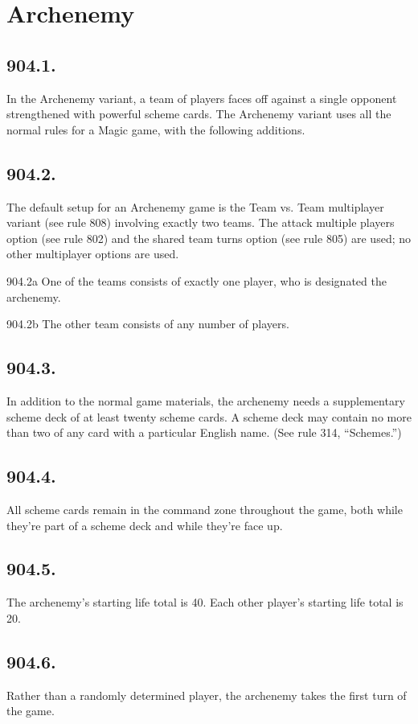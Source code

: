\section{Archenemy}
\subsection*{904.1.}
In the Archenemy variant, a team of players faces off against a single opponent strengthened with powerful scheme cards. The Archenemy variant uses all the normal rules for a Magic game, with the following additions.

\subsection*{904.2.}
The default setup for an Archenemy game is the Team vs. Team multiplayer variant (see rule 808) involving exactly two teams. The attack multiple players option (see rule 802) and the shared team turns option (see rule 805) are used; no other multiplayer options are used.

904.2a One of the teams consists of exactly one player, who is designated the archenemy.

904.2b The other team consists of any number of players.

\subsection*{904.3.}
In addition to the normal game materials, the archenemy needs a supplementary scheme deck of at least twenty scheme cards. A scheme deck may contain no more than two of any card with a particular English name. (See rule 314, “Schemes.”)

\subsection*{904.4.}
All scheme cards remain in the command zone throughout the game, both while they’re part of a scheme deck and while they’re face up.

\subsection*{904.5.}
The archenemy’s starting life total is 40. Each other player’s starting life total is 20.

\subsection*{904.6.}
Rather than a randomly determined player, the archenemy takes the first turn of the game.

